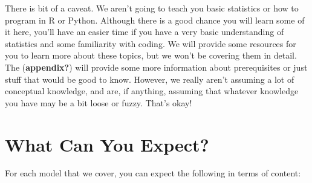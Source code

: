 \documentclass[
  letterpaper,
]{krantz}
\begin{document}
There is bit of a caveat. We aren't going to teach you basic statistics
or how to program in R or Python. Although there is a good chance you
will learn some of it here, you'll have an easier time if you have a
very basic understanding of statistics and some familiarity with coding.
We will provide some resources for you to learn more about these topics,
but we won't be covering them in detail. The (\textbf{appendix?}) will
provide some more information about prerequisites or just stuff that
would be good to know. However, we really aren't assuming a lot of
conceptual knowledge, and are, if anything, assuming that whatever
knowledge you have may be a bit loose or fuzzy. That's okay!

\section*{What Can You Expect?}\label{what-can-you-expect}


For each model that we cover, you can expect the following in terms of
content:
\end{document}
